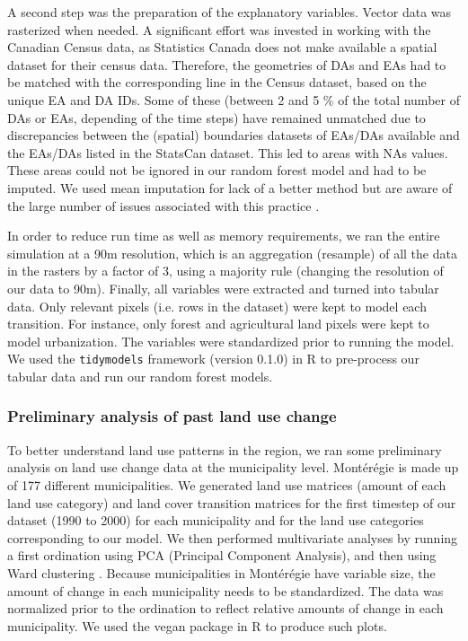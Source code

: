 A second step was the preparation of the explanatory variables. Vector data was rasterized when needed. A significant effort was invested in working with the Canadian Census data, as Statistics Canada does not make available a spatial dataset for their census data. Therefore, the geometries of DAs and EAs had to be matched with the corresponding line in the Census dataset, based on the unique EA and DA IDs. Some of these (between 2 and 5 \% of the total number of DAs or EAs, depending of the time steps) have remained unmatched due to discrepancies between the (spatial) boundaries datasets of EAs/DAs available and the EAs/DAs listed in the StatsCan dataset. This led to areas with NAs values. These areas could not be ignored in our random forest model and had to be imputed. We used mean imputation for lack of a better method but are aware of the large number of issues associated with this practice \citep[see][]{lodder_impute_2014}.

In order to reduce run time as well as memory requirements, we ran the entire simulation at a 90m resolution, which is an aggregation (resample) of all the data in the rasters by a factor of 3, using a majority rule (changing the resolution of our data to 90m). Finally, all variables were extracted and turned into tabular data. Only relevant pixels (i.e. rows in the dataset) were kept to model each transition. For instance, only forest and agricultural land pixels were kept to model urbanization. The variables were standardized prior to running the model. We used the \verb|tidymodels| framework (version 0.1.0) in R to pre-process our tabular data and run our random forest models. \\

\subsubsection{Preliminary analysis of past land use change}

To better understand land use patterns in the region, we ran some preliminary analysis on land use change data at the municipality level. Montérégie is made up of 177 different municipalities. We generated land use matrices (amount of each land use category) and land cover transition matrices for the first timestep of our dataset (1990 to 2000) for each municipality and for the land use categories corresponding to our model. We then performed multivariate analyses by running a first ordination using PCA (Principal Component Analysis), and then using Ward clustering \citep{legendre_ordination_2012}.
Because municipalities in Montérégie have variable size, the amount of change in each municipality needs to be standardized. The data was normalized prior to the ordination to reflect relative amounts of change in each municipality. We used the vegan package in R to produce such plots.\\

